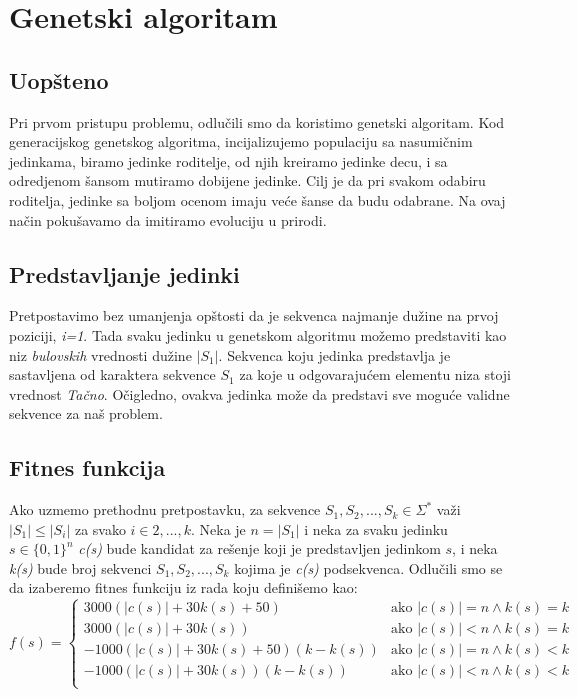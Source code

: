 \documentclass{article}
\begin{document}
    \pagebreak


    \section{Genetski algoritam}

    \subsection{Uopšteno}
    Pri prvom pristupu problemu, odlučili smo da koristimo genetski algoritam. Kod generacijskog genetskog algoritma, incijalizujemo populaciju sa nasumičnim jedinkama, biramo jedinke roditelje, od njih kreiramo jedinke decu, i sa odredjenom šansom mutiramo dobijene jedinke. Cilj je da pri svakom odabiru roditelja, jedinke sa boljom ocenom imaju veće šanse da budu odabrane. Na ovaj način pokušavamo da imitiramo evoluciju u prirodi.

    \subsection{Predstavljanje jedinki}
    Pretpostavimo bez umanjenja opštosti da je sekvenca najmanje dužine na prvoj poziciji, \emph{i=1}. Tada svaku jedinku u genetskom algoritmu možemo predstaviti kao niz \emph{bulovskih} vrednosti dužine $|S_1|$. Sekvenca koju jedinka predstavlja je sastavljena od karaktera sekvence \emph{$S_1$} za koje u odgovarajućem elementu niza stoji vrednost \emph{Tačno}. Očigledno, ovakva jedinka može da predstavi sve moguće validne sekvence za naš problem.

    \subsection{Fitnes funkcija}
    Ako uzmemo prethodnu pretpostavku, za sekvence $S_1, S_2,..., S_k \in \Sigma^*$ važi $|S_1| \leq |S_i|$ za svako $i \in {2,...,k}$. Neka je $n = |S_1|$ i neka za svaku jedinku $s \in \{0,1\}^n$ \emph{c(s)} bude kandidat za rešenje koji je predstavljen jedinkom $s$, i neka \emph{k(s)} bude broj sekvenci $S_1, S_2,..., S_k$ kojima je \emph{c(s)} podsekvenca.
    Odlučili smo se da izaberemo fitnes funkciju iz rada \cite{ft} koju definišemo kao:
    $$ f(s) =
    \begin{cases}
        3000(|c(s)| + 30k(s) + 50) & \text{ako } |c(s)| = n \land k(s) = k \\
        3000(|c(s)| + 30k(s)) & \text{ako } |c(s)| < n \land k(s) = k \\
        -1000(|c(s)| + 30k(s) + 50)(k - k(s)) & \text{ako } |c(s)| = n \land k(s) < k \\
        -1000(|c(s)| + 30k(s))(k - k(s)) & \text{ako } |c(s)| < n \land k(s) < k \\
    \end{cases}
    $$
\end{document}

